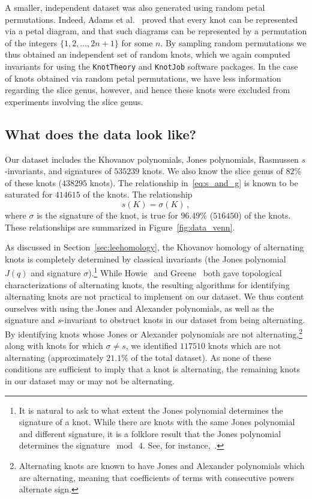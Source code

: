 \documentclass[11pt]{article}
\numberwithin{equation}{section}
\begin{document}
A smaller, independent dataset was also generated using random petal permutations.
Indeed, Adams et al.~\cite{adams2015knot} proved that every knot can be represented via a petal diagram, and that such diagrams can be represented by a permutation of the integers $\{1, 2, \ldots, 2n+1\}$ for some $n$.
By sampling random permutations we thus obtained an independent set of random knots, which we again computed invariants for using the \texttt{KnotTheory} and \texttt{KnotJob} software packages.
In the case of knots obtained via random petal permutations, we have less information regarding the slice genus, however, and hence these knots were excluded from experiments involving the slice genus.

\subsection{What does the data look like?}
Our dataset includes the Khovanov polynomials, Jones polynomials, Rasmussen $s$-invariants, and signatures of $535239$ knots. We also know the slice genus of $82$\% of these knots ($438295$ knots). The relationship in~\eqref{eq:s_and_g} is known to be saturated for $414615$ of the knots. The relationship
\begin{equation}
    s(K) = \sigma(K) \,,
    \label{eq:sig_and_s}
\end{equation}
where $\sigma$ is the signature of the knot, is true for $96.49\%$ ($516450$) of the knots. These relationships are summarized in Figure~\ref{fig:data_venn}. 
%

As discussed in Section~\ref{sec:leehomology}, the Khovanov homology of alternating knots is completely determined by classical invariants (the Jones polynomial $J(q)$ and signature $\sigma$).\footnote{It is natural to ask to what extent the Jones polynomial determines the signature of a knot.  While there are knots with the same Jones polynomial and different signature, it is a folklore result that the Jones polynomial determines the signature $\bmod\ 4$.  See, for instance,~\cite{przytycki2016invariants}.}  While Howie~\cite{howie2017characterisation} and Greene~\cite{greene2017alternating} both gave topological characterizations of alternating knots, the resulting algorithms for identifying alternating knots are not practical to implement on our dataset.  We thus content ourselves with using the Jones and Alexander polynomials, as well as the signature and $s$-invariant to obstruct knots in our dataset from being alternating.  By identifying knots whose Jones or Alexander polynomials are not alternating,\footnote{Alternating knots are known to have Jones and Alexander polynomials which are alternating, meaning that coefficients of terms with consecutive powers alternate sign.} along with knots for which $\sigma \neq s$, we identified $117510$ knots which are not alternating (approximately $21.1\%$ of the total dataset). As none of these conditions are sufficient to imply that a knot is alternating, the remaining knots in our dataset may or may not be alternating.
\end{document}
